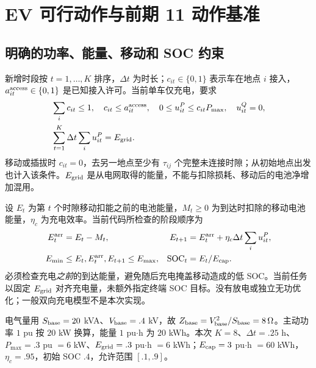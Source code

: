 \documentclass[UTF8,fontset=fandol,11pt,a4paper]{ctexart}
\begin{document}
\section{EV 可行动作与前期 11 动作基准}
\label{sec:actions}
\subsection{明确的功率、能量、移动和 SOC 约束}
新增时段按 $t=1,\ldots,K$ 排序，$\Delta t$ 为时长；$c_{it}\in\{0,1\}$ 表示车在地点 $i$ 接入，$a_{it}^{\rm access}\in\{0,1\}$ 是已知接入许可。当前单车仅充电，要求
\begin{align}
 &\sum_i c_{it}\le1,\quad c_{it}\le a_{it}^{\rm access},\quad
   0\le u^P_{it}\le c_{it}P_{\max},\quad u^Q_{it}=0,\label{eq:power}\\
 &\sum_{t=1}^K\Delta t\sum_i u^P_{it}=E_{\rm grid}.
 \label{eq:gridenergy}
\end{align}
移动或插拔时 $c_{it}=0$，去另一地点至少有 $\tau_{ij}$ 个完整未连接时隙；从初始地点出发也计入该条件。$E_{\rm grid}$ 是从电网取得的能量，不能与扣除损耗、移动后的电池净增加混用。

设 $E_t$ 为第 $t$ 个时隙移动扣能之前的电池能量，$M_t\ge0$ 为到达时扣除的移动电池能量，$\eta_c$ 为充电效率。当前代码所检查的阶段顺序为
\begin{align}
 E_t^{\rm arr}&=E_t-M_t,&
 E_{t+1}&=E_t^{\rm arr}+\eta_c\Delta t\sum_i u^P_{it},\label{eq:soc}\\
 E_{\min}&\le E_t,E_t^{\rm arr},E_{t+1}\le E_{\max},&
 {\rm SOC}_t&=E_t/E_{\rm cap}.
 \label{eq:socrange}
\end{align}
必须检查充电\emph{之前}的到达能量，避免随后充电掩盖移动造成的低 SOC。当前任务以固定 $E_{\rm grid}$ 对齐充电量，未额外指定终端 SOC 目标。没有放电或独立无功优化；一般双向充电模型不是本次实现。

电气量用 $S_{\rm base}=20$ kVA、$V_{\rm base}=.4$ kV，故 $Z_{\rm base}=V_{\rm base}^2/S_{\rm base}=8\,\Omega$。主动功率 $1$ pu 按 $20$ kW 换算，能量 $1$ pu$\cdot$h 为 $20$ kWh。本次 $K=8$、$\Delta t=.25$ h、$P_{\max}=.3$ pu $=6$ kW、$E_{\rm grid}=.3$ pu$\cdot$h $=6$ kWh；$E_{\rm cap}=3$ pu$\cdot$h $=60$ kWh，$\eta_c=.95$，初始 SOC $.4$，允许范围 $[.1,.9]$。
\end{document}
